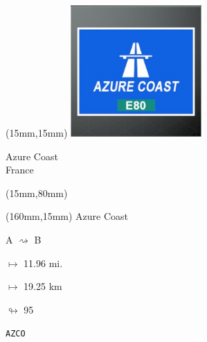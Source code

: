 \begin{textblock*}{50mm}(15mm,15mm)%
\includegraphics[width=50mm]{LG/2015-05-20_00073.png}
\par Azure Coast\\ France
\end{textblock*}
\begin{textblock*}{185mm}(15mm,80mm)%
\end{textblock*}
\begin{textblock*}{40mm}(160mm,15mm)%
Azure Coast
\par A $\rightsquigarrow$ B
\Large
\par$\mapsto$ 11.96 mi.
\par$\mapsto$ 19.25 km
\par$\looparrowright$ 95
\par\hfill\tiny\tt AZCO\\
\end{textblock*}
\null\newpage

